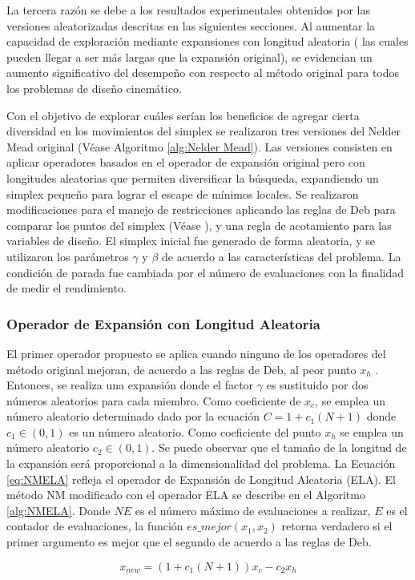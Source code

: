 La tercera razón se debe a los resultados experimentales obtenidos por las versiones aleatorizadas descritas en las siguientes secciones. Al aumentar la capacidad de exploración mediante expansiones con longitud aleatoria ( las cuales pueden llegar a ser más largas que la expansión original), se evidencian un aumento significativo del desempeño con respecto al método original para todos los problemas de diseño cinemático.

Con el objetivo de explorar cuáles serían los beneficios de agregar cierta diversidad en los movimientos del simplex se realizaron tres versiones del Nelder Mead original (Véase Algoritmo \ref{alg:Nelder Mead}). Las versiones consisten en aplicar operadores basados en el operador de expansión original pero con longitudes aleatorias que permiten diversificar la búsqueda, expandiendo un simplex pequeño para lograr el escape de mínimos locales. Se realizaron modificaciones para el manejo de restricciones aplicando las reglas de Deb para comparar los puntos del simplex (Véase \cite{deb_efficient_1998}), y una regla de acotamiento para las variables de diseño. El simplex inicial fue generado de forma aleatoria, y se utilizaron los parámetros  $\gamma$ y $\beta$ de acuerdo a las características del problema. La condición de parada fue cambiada por el número de evaluaciones con la finalidad de medir el rendimiento. 

\subsubsection{Operador de Expansión con Longitud Aleatoria}

El primer operador propuesto se aplica cuando ninguno de los operadores del método original mejoran, de acuerdo a las reglas de Deb, al peor punto $x_h$ . Entonces, se realiza una expansión  donde el factor $\gamma$ es sustituido por dos números aleatorios para cada miembro. Como coeficiente de   $x_c$, se emplea un número aleatorio determinado dado por la ecuación $C =1+c_1(N+1)$ donde $c_1 \in (0,1)$ es un número aleatorio. Como coeficiente del punto $x_h$ se emplea un número aleatorio $c_2 \in (0,1)$. Se puede observar que el tamaño de la longitud de la expansión será proporcional a la dimensionalidad del problema. La Ecuación \ref{eq:NMELA} refleja el operador de Expansión de Longitud Aleatoria (ELA). El método NM modificado con el operador ELA se describe en el Algoritmo \ref{alg:NMELA}. Donde $NE$ es el número máximo de evaluaciones a realizar, $E$ es el contador de evaluaciones, la función $es\_mejor(x_1,x_2)$  retorna verdadero si el primer argumento es mejor que el segundo de acuerdo a las reglas de Deb.
\begin{center}
\begin{equation}\label{eq:NMELA}
x_{new}=(1+c_1(N+1))x_c-c_2 x_h
\end{equation}
\end{center}

